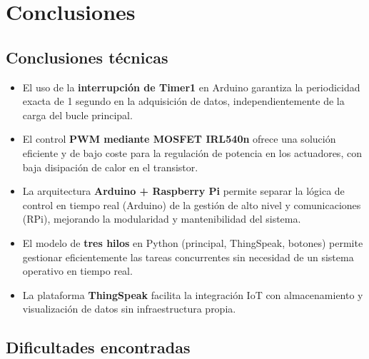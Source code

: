 \documentclass[12pt, a4paper]{article}
\begin{document}
\section{Conclusiones}

\subsection{Conclusiones técnicas}

\begin{itemize}
    \item El uso de la \textbf{interrupción de Timer1} en Arduino garantiza la
          periodicidad exacta de 1 segundo en la adquisición de datos,
          independientemente de la carga del bucle principal.

    \item El control \textbf{PWM mediante MOSFET IRL540n} ofrece una solución
          eficiente y de bajo coste para la regulación de potencia en los actuadores,
          con baja disipación de calor en el transistor.

    \item La arquitectura \textbf{Arduino + Raspberry Pi} permite separar la lógica
          de control en tiempo real (Arduino) de la gestión de alto nivel y
          comunicaciones (RPi), mejorando la modularidad y mantenibilidad del sistema.

    \item El modelo de \textbf{tres hilos} en Python (principal, ThingSpeak, botones)
          permite gestionar eficientemente las tareas concurrentes sin necesidad de
          un sistema operativo en tiempo real.

    \item La plataforma \textbf{ThingSpeak} facilita la integración IoT con
          almacenamiento y visualización de datos sin infraestructura propia.
\end{itemize}

\subsection{Dificultades encontradas}
\end{document}
